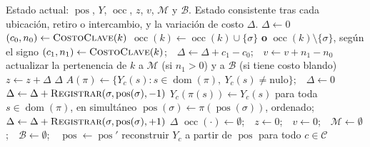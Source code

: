 \documentclass{article}
\begin{document}
\begin{algorithm}[H]
\caption{Operaciones incrementales sobre el horario}
\label{alg:ops}
\begin{algorithmic}[1]
\Require Estado actual: $\operatorname{pos}$, $Y$, $\operatorname{occ}$, $z$, $v$, $\mathcal{M}$ y $\mathcal{B}$.
\Ensure Estado consistente tras cada ubicación, retiro o intercambio, y la variación de costo $\Delta$.
 
    \State $\Delta \gets 0$
        \State $(c_0, n_0) \gets \Call{CostoClave}{k}$
        \State $\operatorname{occ}(k) \gets \operatorname{occ}(k) \cup \{\sigma\}$ \textbf{o} $\operatorname{occ}(k) \setminus \{\sigma\}$, según el signo
        \State $(c_1, n_1) \gets \Call{CostoClave}{k}$;\ \ $\Delta \gets \Delta + c_1 - c_0$;\ \ $v \gets v + n_1 - n_0$
        \State actualizar la pertenencia de $k$ a $\mathcal{M}$ (si $n_1 > 0$) y a $\mathcal{B}$ (si tiene costo blando)
    \EndFor
    \State $z \gets z + \Delta$
    \State \Return $\Delta$
\EndFunction
\Statex
{} 
    \State $A(\pi) \gets \{Y_c(s) : s \in \operatorname{dom}(\pi),\ Y_c(s) \neq \text{nulo}\}$;\ \ $\Delta \gets 0$
        \State $\Delta \gets \Delta + \Call{Registrar}{\sigma, \operatorname{pos}(\sigma), -1}$
    \EndFor
    \State $Y_c(\pi(s)) \gets Y_c(s)$ para toda $s \in \operatorname{dom}(\pi)$, en simultáneo
        \State $\operatorname{pos}(\sigma) \gets \pi(\operatorname{pos}(\sigma))$, ordenado;\ \ $\Delta \gets \Delta + \Call{Registrar}{\sigma, \operatorname{pos}(\sigma), +1}$
    \EndFor
    \State \Return $\Delta$
\EndFunction
\Statex
{}
    \State $\operatorname{occ}(\cdot) \gets \emptyset$;\ \ $z \gets 0$;\ \ $v \gets 0$;\ \ $\mathcal{M} \gets \emptyset$;\ \ $\mathcal{B} \gets \emptyset$;\ \ $\operatorname{pos} \gets \operatorname{pos}'$
    \State reconstruir $Y_c$ a partir de $\operatorname{pos}$ para todo $c \in \mathcal{C}$
    \ForAll{$\sigma \in \Sigma$}
        \State {}
    \EndFor
\EndProcedure
\end{algorithmic}
\end{algorithm}
\end{document}
